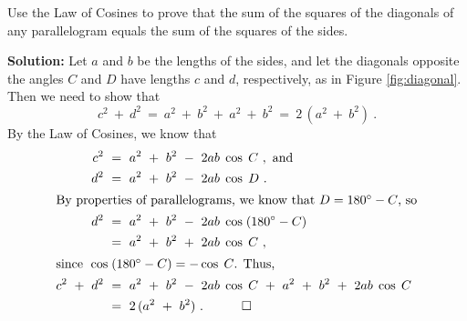 \begin{exmp}
\piccaption[]{\label{fig:diagonal}}
\noindent Use the Law of Cosines to prove that the sum of the squares of the diagonals of any parallelogram
 equals the sum of the squares of the sides.\vspace{1mm}
 \par\noindent\textbf{Solution:} Let $a$ and $b$ be the lengths of the sides, and let the diagonals
 opposite the angles $C$ and $D$ have lengths $c$ and $d$, respectively, as in Figure
 \ref{fig:diagonal}. Then we need to show that
 \begin{displaymath}
  c^2 ~+~ d^2 ~=~ a^2 ~+~ b^2 ~+~ a^2 ~+~ b^2 ~=~ 2\,( a^2 ~+~ b^2 ) ~.
 \end{displaymath}
 By the Law of Cosines, we know that
 \begin{align*}
  c^2 ~ &= ~ a^2 ~ + ~ b^2 ~ - ~ 2ab\;\cos\;C ~,~\text{and}\\
  d^2 ~ &= ~ a^2 ~ + ~ b^2 ~ - ~ 2ab\;\cos\;D ~.\\
  \intertext{By properties of parallelograms, we know that $D = 180^\circ - C$, so}
  d^2 ~ &= ~ a^2 ~ + ~ b^2 ~ - ~ 2ab\;\cos\;(180^\circ - C)\\
  &=~ a^2 ~ + ~ b^2 ~ + ~ 2ab\;\cos\;C ~,\\
  \intertext{since $\;\cos\;(180^\circ - C) = -\cos\;C$. Thus,}
  c^2 ~+~ d^2 ~&=~ a^2 ~ + ~ b^2 ~ - ~ 2ab\;\cos\;C ~+~ a^2 ~ + ~ b^2 ~ + ~ 2ab\;\cos\;C\\
  &=~ 2\,( a^2 ~+~ b^2 ) ~. \quad\qed
 \end{align*}
\end{exmp}\vspace{-4mm}
\divider\vspace{-2mm}
\newpage
\startexercises\label{sec2dot2}
\vspace{5mm}

